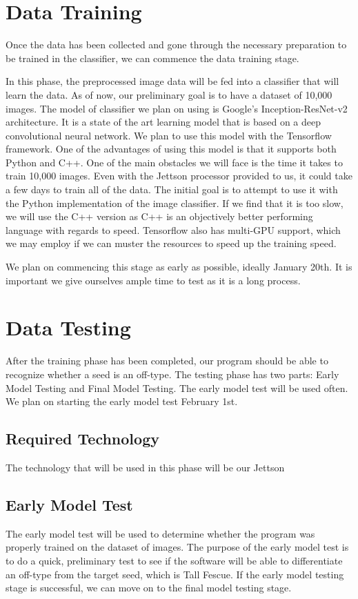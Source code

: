 \documentclass[onecolumn, draftclsnofoot,10pt, compsoc]{IEEEtran}
\begin{document}
\section{Data Training}

Once the data has been collected and gone through the necessary preparation to be trained in the classifier, we can commence the data training stage. 

In this phase, the preprocessed image data will be fed into a classifier that will learn the data. As of now, our preliminary goal is to have a dataset of 10,000 images. The model of classifier we plan on using is Google's Inception-ResNet-v2 architecture. It is a state of the art learning model that is based on a deep convolutional neural network. We plan to use this model with the Tensorflow framework. One of the advantages of using this model is that it supports both Python and C++. One of the main obstacles we will face is the time it takes to train 10,000 images. Even with the Jettson processor provided to us, it could take a few days to train all of the data. The initial goal is to attempt to use it with the Python implementation of the image classifier. If we find that it is too slow, we will use the C++ version as C++ is an objectively better performing language with regards to speed. Tensorflow also has multi-GPU support, which we may employ if we can muster the resources to speed up the training speed.

We plan on commencing this stage as early as possible, ideally January 20th. It is important we give ourselves ample time to test as it is a long process. 

\section{Data Testing}

After the training phase has been completed, our program should be able to recognize whether a seed is an off-type. The testing phase has two parts: Early Model Testing and Final Model Testing. The early model test will be used often. We plan on starting the early model test February 1st. 

\subsection{Required Technology}
The technology that will be used in this phase will be our Jettson 

\subsection{Early Model Test}
The early model test will be used to determine whether the program was properly trained on the dataset of images. The purpose of the early model test is to do a quick, preliminary test to see if the software will be able to differentiate an off-type from the target seed, which is Tall Fescue. If the early model testing stage is successful, we can move on to the final model testing stage. 
\end{document}
